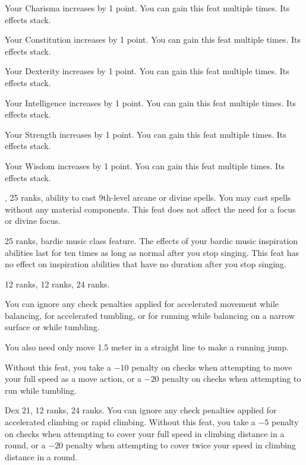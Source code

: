 {}{}
{Your Charisma increases by 1 point.}
{}{You can gain this feat multiple times. Its effects stack.}

{}{}
{Your Constitution increases by 1 point.}
{}{You can gain this feat multiple times. Its effects stack.}

{}{}
{Your Dexterity increases by 1 point.}
{}{You can gain this feat multiple times. Its effects stack.}

{}{}
{Your Intelligence increases by 1 point.}
{}{You can gain this feat multiple times. Its effects stack.}

{}{}
{Your Strength increases by 1 point.}
{}{You can gain this feat multiple times. Its effects stack.}

{}{}
{Your Wisdom increases by 1 point.}
{}{You can gain this feat multiple times. Its effects stack.}

{,  25 ranks, ability to cast 9th-level arcane or divine spells.}
{You may cast spells without any material components. This feat does not affect the need for a focus or divine focus.}

{ 25 ranks, bardic music class feature.}
{The effects of your bardic music inspiration abilities last for ten times as long as normal after you stop singing. This feat has no effect on inspiration abilities that have no duration after you stop singing.}

{}
{ 12 ranks,  12 ranks,  24 ranks.}
{
  You can ignore any check penalties applied for accelerated movement while balancing, for accelerated tumbling, or for running while balancing on a narrow surface or while tumbling.

  You also need only move 1.5 meter in a straight line to make a running jump.
}
{
  Without this feat, you take a $-10$ penalty on  checks when attempting to move your full speed as a move action, or a $-20$ penalty on  checks when attempting to run while tumbling.
}{}

{}
{Dex 21,  12 ranks,  24 ranks.}
{You can ignore any check penalties applied for accelerated climbing or rapid climbing.}
{Without this feat, you take a $-5$ penalty on  checks when attempting to cover your full speed in climbing distance in a round, or a $-20$ penalty when attempting to cover twice your speed in climbing distance in a round.}{}

